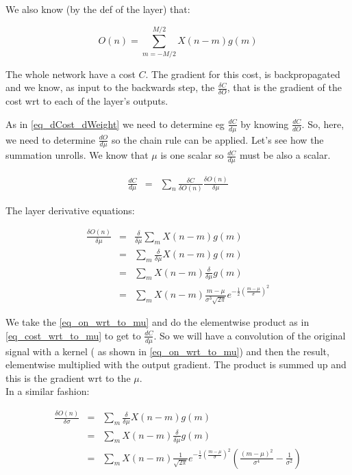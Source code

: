 \documentclass{article}
\begin{document}
We also know (by the def of the layer) that:

\begin{equation}
	O(n) = \sum_{m=-M/2}^{M/2} X(n-m)g(m)
\end{equation}


The whole network have a cost $C$. The gradient for this cost, is backpropagated and we know, as input to the backwards step, the $\frac{\delta C}{\delta O}$, that is the gradient of the cost wrt to each of the layer's outputs. 

As in \eqref{eq_dCost_dWeight} we need to determine eg $\frac{dC}{d\mu}$ by knowing $\frac{dC}{dO}$. So, here, we need to determine $\frac{dO}{d\mu}$ so the chain rule can be applied. Let's see how the summation unrolls. We know that $\mu$ is one scalar so $\frac{dC}{d\mu}$ must be also a scalar.

\begin{eqnarray}
	\label{eq_cost_wrt_to_mu}
	\frac{dC}{d\mu}&=&\sum_n \frac{\delta C}{\delta O(n)} \frac{\delta O(n)}{\delta \mu} 
\end{eqnarray}

The layer derivative equations:

\begin{eqnarray}
	\frac{\delta O(n)}{\delta\mu}&=& \frac{\delta}{\delta \mu} \sum_m X(n-m)g(m)\\
	&=&\sum_m \frac{\delta}{\delta \mu} X(n-m)g(m) \\
	&=&\sum_m X(n-m) \frac{\delta}{\delta \mu} g(m) \\
	\label{eq_on_wrt_to_mu}
	&=&\sum_m X(n-m) \frac{m - \mu}{\sigma ^3 \sqrt{2 \pi}} e^{-\frac{1}{2} \left(\frac{m - \mu}{\sigma}\right)^2}
\end{eqnarray}

We take the \eqref{eq_on_wrt_to_mu} and do the elementwise product as in \eqref{eq_cost_wrt_to_mu} to get to $\frac{dC}{d\mu}$. So we will have a convolution of the original signal with a kernel ( as shown in \eqref{eq_on_wrt_to_mu}) and then the result, elementwise multiplied with the output gradient. The product is summed up and this is the gradient wrt to the $\mu$.\\

In a similar fashion:


\begin{eqnarray}
	\frac{\delta O(n)}{\delta\sigma}&=& \sum_m \frac{\delta}{\delta \mu} X(n-m)g(m) \\
	&=&\sum_m X(n-m) \frac{\delta}{\delta \mu} g(m) \\
	&=&\sum_m X(n-m) \frac{1}{\sqrt{2 \pi}} e^{-\frac{1}{2} \left(\frac{m - \mu}{\sigma}\right)^2} \left( \frac{(m-\mu)^2}{\sigma^4}  - \frac{1}{\sigma ^2} \right)
\end{eqnarray}
\end{document}
